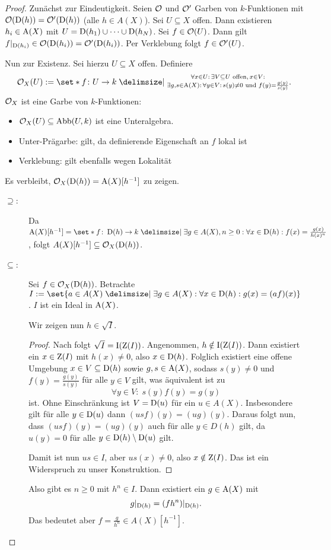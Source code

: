 \documentclass[12pt,a4paper]{scrartcl}
\theoremstyle{cplain}
\theoremstyle{cdef}
\begin{document}

\begin{proof}
	Zunächst zur Eindeutigkeit. Seien $\mathcal{O}$ und $\mathcal{O}'$ Garben von $k$-Funktionen mit $\mathcal{O}(\operatorname{D}(h)) = \mathcal{O}'(\operatorname{D}(h))$ (alle $h\in A(X)$). Sei $U\subseteq X$ offen. Dann existieren $h_i\in \operatorname{A}(X)$ mit $U = \operatorname{D}(h_1)\cup\dots\cup\operatorname{D}(h_N)$. Sei $f\in\mathcal{O}(U)$. Dann gilt $f|_{\operatorname{D}(h_i)}\in\mathcal{O}(\operatorname{D}(h_i)) = \mathcal{O}'(\operatorname{D}(h_i))$. Per Verklebung folgt $f\in \mathcal{O}'(U)$.
	
	Nun zur Existenz. Sei hierzu $U\subseteq X$ offen. Definiere \[\Os_X(U) := \set*{f\colon U\to k\given \substack{\forall x\in U :\, \exists V\subseteq U\text{ offen},\, x\in V: \\\exists g,s\in \A(X):\, \forall y\in V:\, s(y) \neq 0\text{ und } f(y) = \frac{g(y)}{s(y)}}}.\]
	$\mathcal{O}_X$ ist eine Garbe von $k$-Funktionen:
	\begin{itemize}
		\item $\mathcal{O}_X(U)\subseteq \operatorname{Abb}(U, k)$ ist eine Unteralgebra.
		\item Unter-Prägarbe: gilt, da definierende Eigenschaft an $f$ lokal ist
		\item Verklebung: gilt ebenfalls wegen Lokalität
	\end{itemize}
	Es verbleibt, $\mathcal{O}_X(\operatorname{D}(h)) = \operatorname{A}(X)[h^{-1}]$ zu zeigen.
	\begin{description}
		\item[\glqq$\supseteq$\grqq:] Da $\A(X)[h^{-1}] = \set*{f\colon \D(h)\to k\given \exists g\in A(X), n\ge 0 :\forall x\in\D(h): f(x) = \frac{g(x)}{h(x)^n}}$, folgt $A(X)[h^{-1}] \subseteq \mathcal{O}_X(\operatorname{D}(h))$.
		\item[\glqq$\subseteq$\grqq:] Sei $f\in\mathcal{O}_X(\operatorname{D}(h))$. Betrachte
		$I := \set{a\in A(X)\given \exists g\in A(X): \forall x\in \D(h): g(x) = (af)(x)}$. $I$ ist ein Ideal in $\operatorname{A}(X)$.
		
		Wir zeigen nun $h\in\sqrt I$.
		\begin{proof}
			Nach  folgt $\sqrt{I} = \operatorname{I}(\operatorname{Z}(I))$. Angenommen, $h\notin \operatorname{I}(\operatorname{Z}(I))$. Dann existiert ein $x\in \operatorname{Z}(I)$ mit $h(x) \neq 0$, also $x\in\operatorname{D}(h)$. Folglich existiert eine offene Umgebung $x\in V\subseteq \operatorname{D}(h)$ sowie $g, s\in \operatorname{A}(X)$, sodass $s(y) \neq 0$ und $f(y) = \frac{g(y)}{s(y)}$ für alle $y \in V$ gilt, was äquivalent ist zu \[\forall y\in V:\;s(y)f(y) = g(y)\] ist.
			Ohne Einschränkung ist $V = \operatorname{D}(u)$ für ein $u\in A(X)$. Insbesondere gilt für alle $y\in \operatorname{D}(u)$ dann $(usf)(y) = (ug)(y)$. Daraus folgt nun, dass $(usf)(y) = (ug)(y)$ auch für alle $y\in D(h)$ gilt, da $u(y) = 0$ für alle $y\in \operatorname{D}(h)\setminus \operatorname{D}(u)$ gilt.

			Damit ist nun $us\in I$, aber $us(x) \neq 0$, also $x\notin \operatorname{Z}(I)$. Das ist ein Widerspruch zu unser Konstruktion.
		\end{proof}
		
		Also gibt es $n\ge 0$ mit $h^n \in I$. Dann existiert ein $g\in \operatorname{A}(X)$ mit \[g|_{\operatorname{D}(h)} = (fh^n)|_{\operatorname{D}(h)}.\]
		Das bedeutet aber $f = \frac{g}{h^n}\in A(X)[h^{-1}]$.
		\qedhere
	\end{description}
\end{proof}
\end{document}
